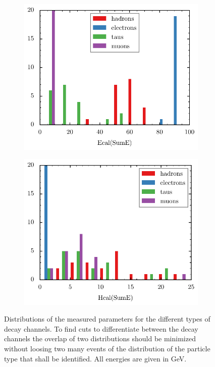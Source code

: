 \documentclass[11pt, a4paper]{article}
\numberwithin{equation}{section}
\begin{document}
\begin{figure}[htb]
\begin{subfigure}{.5\textwidth}
	\end{subfigure}
	\begin{subfigure}{.5\textwidth}
		\centering
		\includegraphics[width=\textwidth]{./figures/event_display/Ecal(SumE)}

	\end{subfigure}
	\begin{subfigure}{.5\textwidth}
		\centering
		\includegraphics[width=\textwidth]{./figures/event_display/Hcal(SumE)}

	\end{subfigure}
	\caption{Distributions of the measured parameters for the different types of decay channels. To find cuts to differentiate between the decay channels the overlap of two distributions should be minimized without loosing two many events of the distribution of the particle type that shall be identified. All energies are given in \si{GeV}.}
	\label{fig:histograms}
\end{figure}
\end{document}
